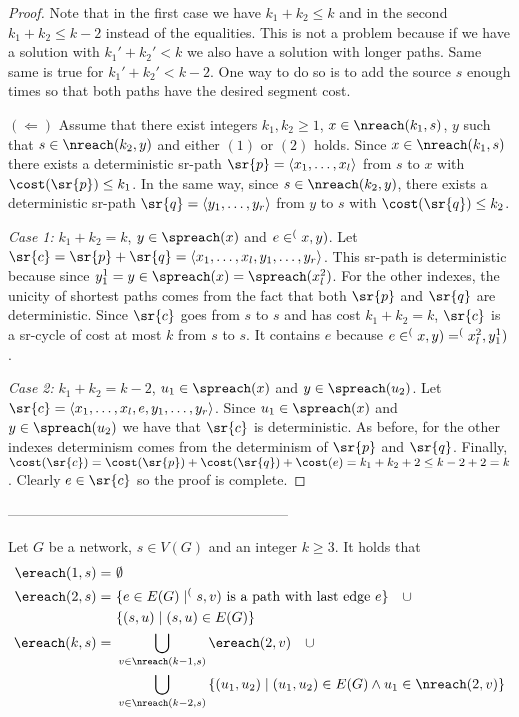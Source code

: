 \begin{proof}
Note that in the first case we have $k_1 + k_2 \leq k$ and in the second $k_1 + k_2 \leq k - 2$ instead of the equalities. 
This is not a problem because if we have a solution with $k_1' + k_2' < k$ we also have a solution with longer paths. Same same is
true for $k_1' + k_2' < k - 2$. One way to do so is to add the source $s$ enough times so that both paths have the desired segment cost.

$(\Leftarrow)$ Assume that there exist integers $k_1, k_2 \geq 1$, $x \in \nreach(k_1, s)$, $y$ such that $s \in \nreach(k_2, y)$ 
and either $(1)$ or $(2)$ holds. Since $x \in \nreach(k_1, s)$ there exists a deterministic sr-path
$\sr{p} = \langle x_1, \ldots, x_l \rangle$ from $s$ to $x$ with $\cost(\sr{p}) \leq k_1$. In the same way, since $s \in \nreach(k_2, y)$,
there exists a deterministic sr-path $\sr{q} = \langle y_1, \ldots, y_r \rangle$ from $y$ to $s$ with $\cost(\sr{q}) \leq k_2$.

\emph{Case 1:} $k_1 + k_2 = k$, $y \in \spreach(x)$ and $e \in \sp(x, y)$. 
Let $\sr{c} = \sr{p} + \sr{q} = \langle x_1, \ldots, x_l, y_1, \ldots, y_r \rangle$. 
This sr-path is deterministic because since $y^1_1 = y \in \spreach(x) = \spreach(x^2_l)$. 
For the other indexes, the unicity of shortest paths comes from the fact that both $\sr{p}$ and $\sr{q}$
are deterministic. Since $\sr{c}$ goes from $s$ to $s$ and has cost $k_1 + k_2 = k$, $\sr{c}$ is a sr-cycle of cost at most $k$ from $s$ to $s$.
It contains $e$ because $e \in \sp(x, y) = \sp(x^2_l, y^1_1)$.

\emph{Case 2:} $k_1 + k_2 = k - 2$, $u_1 \in \spreach(x)$ and $y \in \spreach(u_2)$. Let $\sr{c} = \langle x_1, \ldots, x_l, e, y_1, \ldots, y_r \rangle$.
Since $u_1 \in \spreach(x)$ and $y \in \spreach(u_2)$ we have that $\sr{c}$ is deterministic. As before, for the other indexes determinism comes from the 
determinism of $\sr{p}$ and $\sr{q}$. Finally, $\cost(\sr{c}) = \cost(\sr{p}) + \cost(\sr{q}) + \cost(e) = k_1 + k_2 + 2 \leq k - 2 + 2 = k$. Clearly $e \in \sr{c}$
so the proof is complete.
\end{proof}


------------------------------------------------------------


\begin{theorem}
\label{thm:ereach}
Let $G$ be a network, $s \in V(G)$ and an integer $k \geq 3$. It holds that
\begin{align*}
\ereach(1, s) = & \ \emptyset \\
\ereach(2, s) = & \ \{ e \in E(G) \mid \sp(s, v) \textrm{ is a path with last edge $e$} \} \quad \cup \\
                & \ \{ (s, u) \mid (s, u) \in E(G) \} \\
\ereach(k, s) = & \ \bigcup_{v \in \nreach(k - 1, s)} \ereach(2, v) \quad \cup \\ 
& \ \bigcup_{v \in \nreach(k - 2, s)}  \left\{ (u_1, u_2) \mid (u_1, u_2) \in E(G) \wedge u_1 \in \nreach(2, v) \right\}
\end{align*}
\end{theorem}

